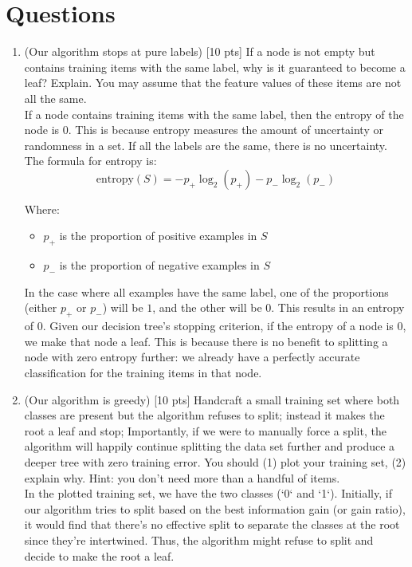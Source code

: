 \documentclass[a4paper]{article}
\theoremstyle{definition}
\begin{document}
\section{Questions}
\begin{enumerate}
\item (Our algorithm stops at pure labels) [10 pts] If a node is not empty but contains training items with the same label, why is it guaranteed to become a leaf?  Explain. You may assume that the feature values of these items are not all the same. \\

If a node contains training items with the same label, then the entropy of the node is \(0\). This is because entropy measures the amount of uncertainty or randomness in a set. If all the labels are the same, there is no uncertainty. The formula for entropy is:
\[ \text{entropy}(S) = -p_+ \log_2(p_+) - p_- \log_2(p_-) \]

Where:

\begin{itemize}
    \item \( p_+ \) is the proportion of positive examples in \( S \)
    \item \( p_- \) is the proportion of negative examples in \( S \)
\end{itemize}

In the case where all examples have the same label, one of the proportions (either \( p_+ \) or \( p_- \)) will be \(1\), and the other will be \(0\). This results in an entropy of \(0\).
Given our decision tree's stopping criterion, if the entropy of a node is \(0\), we make that node a leaf. This is because there is no benefit to splitting a node with zero entropy further: we already have a perfectly accurate classification for the training items in that node.

\item (Our algorithm is greedy)  [10 pts] Handcraft a small training set where both classes are present but the algorithm refuses to split; instead it makes the root a leaf and stop;
Importantly, if we were to manually force a split, the algorithm will happily continue splitting the data set further and produce a deeper tree with zero training error.
You should (1) plot your training set, (2) explain why.  Hint: you don't need more than a handful of items. \\

In the plotted training set, we have the two classes (`0` and `1`). Initially, if our algorithm tries to split based on the best information gain (or gain ratio), it would find that there's no effective split to separate the classes at the root since they're intertwined. Thus, the algorithm might refuse to split and decide to make the root a leaf.


\end{enumerate}
\end{document}
